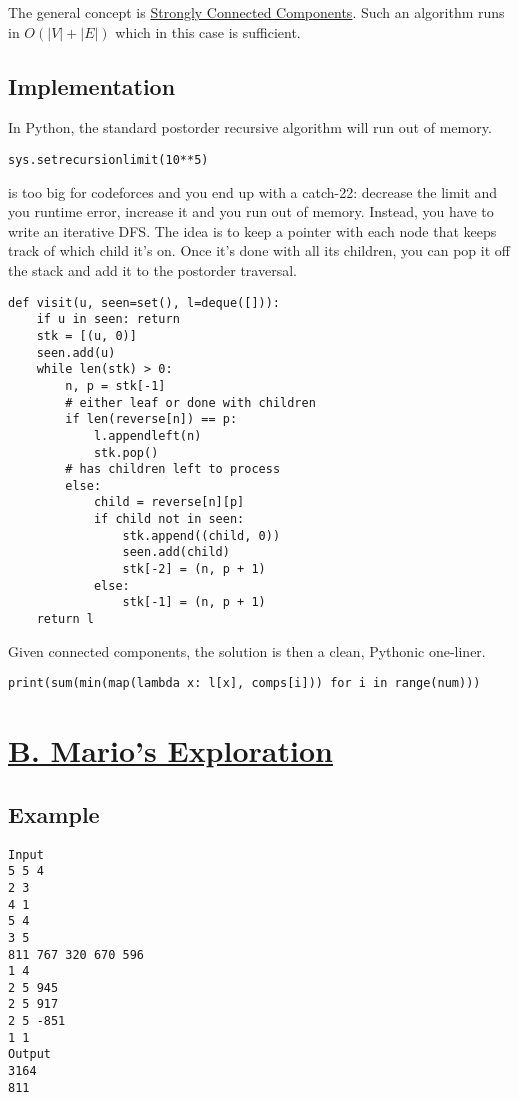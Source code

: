 \documentclass[11pt, oneside]{article}
\begin{document}
The general concept is \href{https://activities.tjhsst.edu/sct/lectures/1920/2019_11_01_Strongly_Connected_Components.pdf}{Strongly Connected Components}.
Such an algorithm runs in \( O(|V| + |E|) \) which in this case is sufficient.

\subsection{Implementation}

In Python, the standard postorder recursive algorithm will run out of memory.
\begin{verbatim}
sys.setrecursionlimit(10**5)
\end{verbatim}
is too big for codeforces and you end up with a catch-22: decrease the limit and you
runtime error, increase it and you run out of memory.
Instead, you have to write an iterative DFS. The idea is to keep a pointer with each node
that keeps track of which child it's on. Once it's done with all its children,
you can pop it off the stack and add it to the postorder traversal.

\begin{verbatim}
def visit(u, seen=set(), l=deque([])):
    if u in seen: return
    stk = [(u, 0)]
    seen.add(u)
    while len(stk) > 0:
        n, p = stk[-1]
        # either leaf or done with children
        if len(reverse[n]) == p:
            l.appendleft(n)
            stk.pop()
        # has children left to process
        else:
            child = reverse[n][p]
            if child not in seen:
                stk.append((child, 0))
                seen.add(child)
                stk[-2] = (n, p + 1)
            else:
                stk[-1] = (n, p + 1)
    return l
\end{verbatim}

Given connected components, the solution is then a clean, Pythonic one-liner.
\begin{verbatim}
print(sum(min(map(lambda x: l[x], comps[i])) for i in range(num)))
\end{verbatim}

\newpage

\section{\href{https://codeforces.com/group/M4wsRWBHyZ/contest/259141/problem/B}{B. Mario's Exploration}}

\subsection{Example}
\begin{verbatim}
Input
5 5 4
2 3
4 1
5 4
3 5
811 767 320 670 596
1 4
2 5 945
2 5 917
2 5 -851
1 1
Output
3164
811
\end{verbatim}
\end{document}
